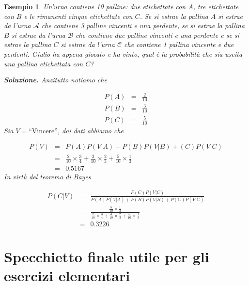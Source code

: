 \documentclass[
  11pt,
]{book}
\theoremstyle{mytheoremstyle}
\theoremstyle{mydefstyle}
\newtheorem{example}{{Esempio}}[section]
\begin{document}
\begin{example}
Un'urna contiene 10 palline: due etichettate con \(A\), tre etichettate
con \(B\) e le rimanenti cinque etichettate con \(C\). Se si estrae la
pallina \(A\) si estrae da l'urna \(\mathcal{A}\) che contiene 3 palline
vincenti e una perdente, se si estrae la pallina \(B\) si estrae da l'urna
\(\mathcal{B}\) che contiene due palline vincenti e una perdente e se si
estrae la pallina \(C\) si estrae da l'urna \(\mathcal{C}\) che contiene 1
pallina vincente e due perdenti. Giulio ha appena giocato e ha vinto,
qual è la probabilità che sia uscita una pallina etichettata con \(C\)?

\textbf{Soluzione.} Anzitutto notiamo che

\begin{eqnarray*}
P(A)&=&\frac 2{10}\\
P(B)&=&\frac 3{10}\\
P(C)&=&\frac 5{10}
\end{eqnarray*} Sia \(V=\text{“Vincere''}\), dai dati abbiamo che

\begin{eqnarray*}
P(V)&=&P(A)P(V|A)+P(B)P(V| B)+(C)P(V| C)\\
&=& \frac 2{10} \times \frac 34 + \frac 3{10} \times \frac 23 + \frac 5{10} \times \frac 13\\
&=& 0.5167
\end{eqnarray*} In virtù del teorema di Bayes

\begin{eqnarray*}
P(C|V)&=&\frac{P(C)P(V| C)}{P(A)P(V|A)+P(B)P(V| B)+P(C)P(V| C)}\\
&=& \frac{\frac 5{10} \times \frac 13}{\frac 2{10} \times \frac 34 + \frac 3{10} \times \frac 23 + \frac 5{10} \times \frac 13}\\
&=& 0.3226
\end{eqnarray*}
\end{example}

\clearpage

\section{Specchietto finale utile per gli esercizi elementari}\label{specchietto-finale-utile-per-gli-esercizi-elementari}
\end{document}
